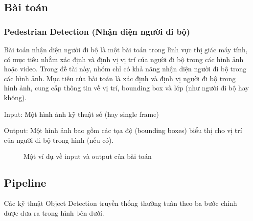 \subsection{Bài toán}
\subsubsection{Pedestrian Detection (Nhận diện người đi bộ)}
Bài toán nhận diện người đi bộ là một bài toán trong lĩnh vực thị giác máy tính, có mục tiêu nhằm xác định và định vị vị trí của người đi bộ trong các hình ảnh hoặc video. Trong đề tài này, nhóm chỉ có khả năng nhận diện người đi bộ trong các hình ảnh. Mục tiêu của bài toán là xác định và định vị người đi bộ trong hình ảnh, cung cấp thông tin về vị trí, bounding box và lớp (như người đi bộ hay không).

Input: Một hình ảnh kỹ thuật số (hay single frame)

Output: Một hình ảnh bao gồm các tọa độ (bounding boxes) biểu thị cho vị trí của người đi bộ trong hình (nếu có).
\vfill
\graphicspath{{figures/}}
\begin{figure}[h!]
    \centering
    \qquad
    \caption{Một ví dụ về input và output của bài toán}
\end{figure}
\subsection{Pipeline}
Các kỹ thuật Object Detection truyền thống thường tuân theo ba bước chính được đưa ra trong hình bên dưới.

